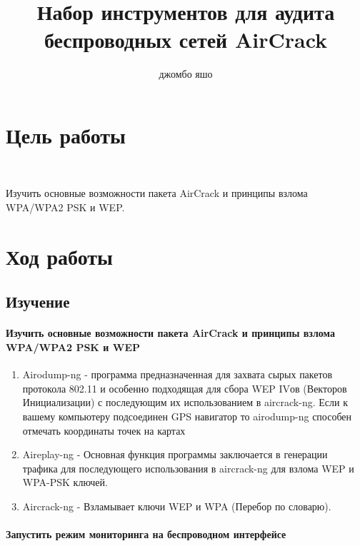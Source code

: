 \documentclass[10pt,a4paper]{article}
\author{джомбо яшо}
\title{Набор инструментов для аудита беспроводных сетей AirCrack}
\begin{document}
\maketitle

\section{Цель работы}
~

Изучить основные возможности пакета AirCrack и принципы взлома WPA/WPA2 PSK и WEP.

\section{Ход работы}
\subsection{Изучение}

\paragraph{Изучить основные возможности пакета AirCrack и принципы взлома WPA/WPA2 PSK и WEP}

\begin{enumerate}
\item Airodump-ng - программа предназначенная для захвата сырых пакетов протокола 802.11 и особенно подходящая для сбора WEP IVов (Векторов Инициализации) с последующим их использованием в aircrack-ng. Если к вашему компьютеру подсоединен GPS навигатор
то airodump-ng способен отмечать координаты точек на картах

\item Aireplay-ng - Основная функция программы заключается в генерации трафика для последующего использования в aircrack-ng для взлома WEP и WPA-PSK ключей.

\item Aircrack-ng - Взламывает ключи WEP и WPA (Перебор по словарю).
\end{enumerate}

\paragraph{Запустить режим мониторинга на беспроводном интерфейсе}
\end{document}
